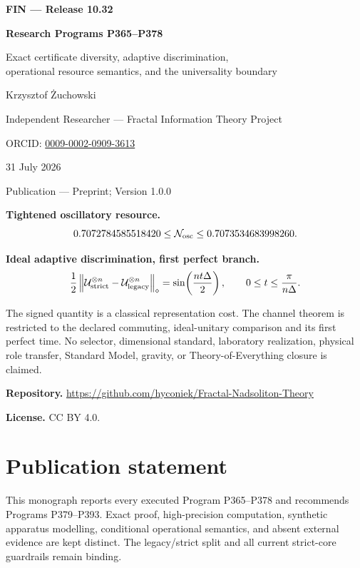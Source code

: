 \documentclass[11pt,a4paper,openany]{report}
\begin{document}
\hypersetup{pageanchor=false}
\begin{titlepage}
\centering
\vspace*{7mm}
{\Large\bfseries FIN --- Release 10.32\par}
\vspace{9mm}
{\Huge\bfseries Research Programs P365--P378\par}
\vspace{6mm}
{\Large Exact certificate diversity, adaptive discrimination,\\
operational resource semantics, and the universality boundary\par}
\vspace{13mm}
{\Large Krzysztof \.Zuchowski\par}
\vspace{2mm}
{\normalsize Independent Researcher --- Fractal Information Theory Project\par}
\vspace{2mm}
{\normalsize ORCID:
\href{https://orcid.org/0009-0002-0909-3613}{0009-0002-0909-3613}\par}
\vspace{7mm}
{\large 31 July 2026\par}
{\normalsize Publication --- Preprint; Version 1.0.0\par}
\vfill
\begin{minipage}{0.92\textwidth}
\small
\textbf{Tightened oscillatory resource.}
\[
0.7072784585518420
\leq\mathcal N_{\rm osc}
\leq0.7073534683998260.
\]

\textbf{Ideal adaptive discrimination, first perfect branch.}
\[
\frac12\left\|
\mathcal U_{\rm strict}^{\otimes n}
-\mathcal U_{\rm legacy}^{\otimes n}
\right\|_{\diamond}
=
\sin\!\left(\frac{nt\Delta}{2}\right),
\qquad
0\leq t\leq\frac{\pi}{n\Delta}.
\]

The signed quantity is a classical representation cost. The channel theorem
is restricted to the declared commuting, ideal-unitary comparison and its
first perfect time. No selector, dimensional standard, laboratory
realization, physical role transfer, Standard Model, gravity, or
Theory-of-Everything closure is claimed.

\medskip
\textbf{Repository.}
\url{https://github.com/hyconiek/Fractal-Nadsoliton-Theory}

\textbf{License.} CC BY 4.0.
\end{minipage}
\vfill
\end{titlepage}
\hypersetup{pageanchor=true}
\chapter*{Publication statement}
This monograph reports every executed Program P365--P378 and recommends
Programs P379--P393. Exact proof, high-precision computation, synthetic
apparatus modelling, conditional operational semantics, and absent external
evidence are kept distinct. The legacy/strict split and all current
strict-core guardrails remain binding.
\end{document}
